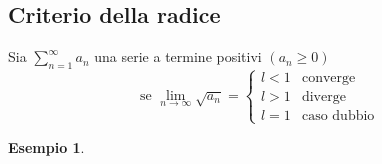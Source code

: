 \documentclass{book}
\newtheorem{esempio}{Esempio}
\begin{document}
\subsection{Criterio della radice}
Sia $\sum_{n=1}^\infty a_n$ una serie a termine positivi $(a_n\geq 0)$
\begin{equation*}
  \text{se }\lim_{n\to \infty} \sqrt{a_n}=\begin{cases}
                                            l<1 & \text{converge}\\
                                            l>1 & \text{diverge}\\
                                            l=1 & \text{caso dubbio}
                                          \end{cases}
\end{equation*}
\begin{esempio}
  
\end{esempio}

\printindex
\end{document}
